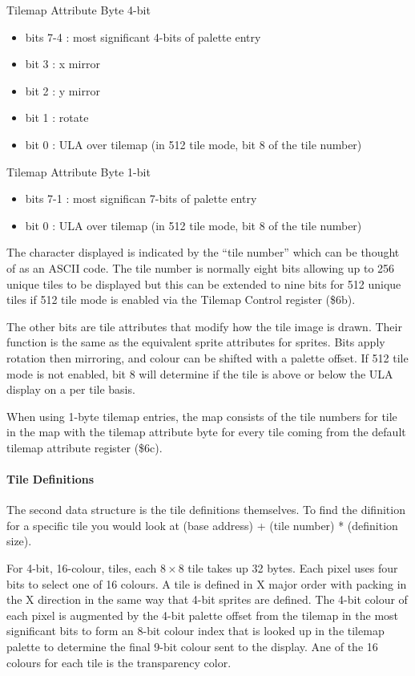 Tilemap Attribute Byte 4-bit
\begin{itemize}
\item[] bits 7-4 : most significant 4-bits of palette entry
\item[] bit 3 : x mirror
\item[] bit 2 : y mirror
\item[] bit 1 : rotate
\item[] bit 0 : ULA over tilemap (in 512 tile mode, bit 8 of the tile
  number)
\end{itemize}

Tilemap Attribute Byte 1-bit
\begin{itemize}
\item[] bits 7-1 : most significan 7-bits of palette entry
\item[] bit 0 : ULA over tilemap (in 512 tile mode, bit 8 of the tile
  number)
\end{itemize}

The character displayed is indicated by the “tile number” which can be
thought of as an ASCII code. The tile number is normally eight bits
allowing up to 256 unique tiles to be displayed but this can be
extended to nine bits for 512 unique tiles if 512 tile mode is enabled
via the Tilemap Control register (\$6b).

The other bits are tile attributes that modify how the tile image is
drawn. Their function is the same as the equivalent sprite attributes
for sprites. Bits apply rotation then mirroring, and colour can be
shifted with a palette offset. If 512 tile mode is not enabled, bit 8
will determine if the tile is above or below the ULA display on a per
tile basis.

When using 1-byte tilemap entries, the map consists of the tile
numbers for tile in the map with the tilemap attribute byte for every
tile coming from the default tilemap attribute register (\$6c).

\paragraph{Tile Definitions}
The second data structure is the tile definitions themselves. To find
the difinition for a specific tile you would look at (base address) +
(tile number) * (definition size).

For 4-bit, 16-colour, tiles, each $8\times8$ tile takes up 32
bytes. Each pixel uses four bits to select one of 16 colours. A tile
is defined in X major order with packing in the X direction in the
same way that 4-bit sprites are defined. The 4-bit colour of each
pixel is augmented by the 4-bit palette offset from the tilemap in the
most significant bits to form an 8-bit colour index that is looked up
in the tilemap palette to determine the final 9-bit colour sent to the
display. Ane of the 16 colours for each tile is the transparency
color.

